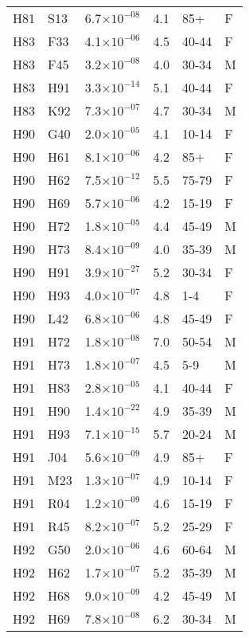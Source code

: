 \begin{longtable}{lllrll}
   H81 & S13 & 6.7$\times10^{-08}$ & 4.1 & 85+ & F \\ 
   H83 & F33 & 4.1$\times10^{-06}$ & 4.5 & 40-44 & F \\ 
   H83 & F45 & 3.2$\times10^{-08}$ & 4.0 & 30-34 & M \\ 
   H83 & H91 & 3.3$\times10^{-14}$ & 5.1 & 40-44 & F \\ 
   H83 & K92 & 7.3$\times10^{-07}$ & 4.7 & 30-34 & M \\ 
   H90 & G40 & 2.0$\times10^{-05}$ & 4.1 & 10-14 & F \\ 
   H90 & H61 & 8.1$\times10^{-06}$ & 4.2 & 85+ & F \\ 
   H90 & H62 & 7.5$\times10^{-12}$ & 5.5 & 75-79 & F \\ 
   H90 & H69 & 5.7$\times10^{-06}$ & 4.2 & 15-19 & F \\ 
   H90 & H72 & 1.8$\times10^{-05}$ & 4.4 & 45-49 & M \\ 
   H90 & H73 & 8.4$\times10^{-09}$ & 4.0 & 35-39 & M \\ 
   H90 & H91 & 3.9$\times10^{-27}$ & 5.2 & 30-34 & F \\ 
   H90 & H93 & 4.0$\times10^{-07}$ & 4.8 & 1-4 & F \\ 
   H90 & L42 & 6.8$\times10^{-06}$ & 4.8 & 45-49 & F \\ 
   H91 & H72 & 1.8$\times10^{-08}$ & 7.0 & 50-54 & M \\ 
   H91 & H73 & 1.8$\times10^{-07}$ & 4.5 & 5-9 & M \\ 
   H91 & H83 & 2.8$\times10^{-05}$ & 4.1 & 40-44 & F \\ 
   H91 & H90 & 1.4$\times10^{-22}$ & 4.9 & 35-39 & M \\ 
   H91 & H93 & 7.1$\times10^{-15}$ & 5.7 & 20-24 & M \\ 
   H91 & J04 & 5.6$\times10^{-09}$ & 4.9 & 85+ & F \\ 
   H91 & M23 & 1.3$\times10^{-07}$ & 4.9 & 10-14 & F \\ 
   H91 & R04 & 1.2$\times10^{-09}$ & 4.6 & 15-19 & F \\ 
   H91 & R45 & 8.2$\times10^{-07}$ & 5.2 & 25-29 & F \\ 
   H92 & G50 & 2.0$\times10^{-06}$ & 4.6 & 60-64 & M \\ 
   H92 & H62 & 1.7$\times10^{-07}$ & 5.2 & 35-39 & M \\ 
   H92 & H68 & 9.0$\times10^{-09}$ & 4.2 & 45-49 & M \\ 
   H92 & H69 & 7.8$\times10^{-08}$ & 6.2 & 30-34 & M \\ 

\end{longtable}
